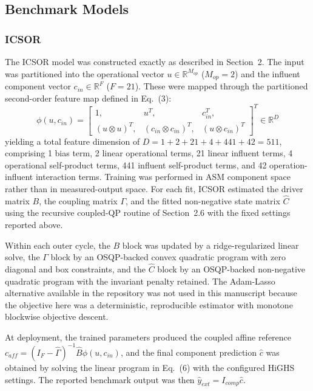 \documentclass[11pt]{article}
\begin{document}
\subsection{Benchmark Models}

\subsubsection{ICSOR}

The ICSOR model was constructed exactly as described in Section~2. The input was partitioned into the operational vector $u \in \mathbb{R}^{M_{op}}$ ($M_{op} = 2$) and the influent component vector $c_{in} \in \mathbb{R}^{F}$ ($F = 21$). These were mapped through the partitioned second-order feature map defined in Eq.~(3):
\begin{equation*}
\phi(u, c_{in}) = \begin{bmatrix}
1, & u^T, & c_{in}^T, \\
(u \otimes u)^T, & (c_{in} \otimes c_{in})^T, & (u \otimes c_{in})^T
\end{bmatrix}^T \in \mathbb{R}^D
\end{equation*}
yielding a total feature dimension of $D = 1 + 2 + 21 + 4 + 441 + 42 = 511$, comprising 1 bias term, 2 linear operational terms, 21 linear influent terms, 4 operational self-product terms, 441 influent self-product terms, and 42 operation-influent interaction terms. Training was performed in ASM component space rather than in measured-output space. For each fit, ICSOR estimated the driver matrix $B$, the coupling matrix $\Gamma$, and the fitted non-negative state matrix $\widehat{C}$ using the recursive coupled-QP routine of Section~2.6 with the fixed settings reported above.

Within each outer cycle, the $B$ block was updated by a ridge-regularized linear solve, the $\Gamma$ block by an OSQP-backed convex quadratic program with zero diagonal and box constraints, and the $\widehat{C}$ block by an OSQP-backed non-negative quadratic program with the invariant penalty retained. The Adam-Lasso alternative available in the repository was not used in this manuscript because the objective here was a deterministic, reproducible estimator with monotone blockwise objective descent.

At deployment, the trained parameters produced the coupled affine reference $c_{aff} = (I_F - \widehat{\Gamma})^{-1}\widehat{B}\phi(u, c_{in})$, and the final component prediction $\hat{c}$ was obtained by solving the linear program in Eq.~(6) with the configured HiGHS settings. The reported benchmark output was then $\hat{y}_{ext} = I_{comp}\hat{c}$.
\end{document}
